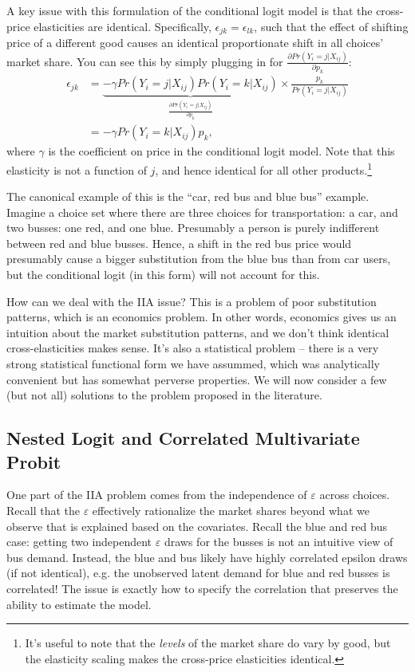 \documentclass{tufte-handout}
\theoremstyle{break}
\begin{document}
A key issue with this formulation of the conditional logit model is that the cross-price elasticities are identical. Specifically, $\epsilon_{jk} = \epsilon_{lk}$, such that the effect of shifting price of a different good causes an identical proportionate shift in all choices' market share. You can see this by simply plugging in for $ \frac{\partial Pr(Y_{i} = j | X_{ij})}{\partial p_{k}}$:  \begin{align*}
            \epsilon_{jk} &= \underbrace{-\gamma Pr(Y_{i} = j|X_{ij} )Pr(Y_{i} = k | X_{ij} )}_{\frac{\partial Pr(Y_{i} = j | X_{ij} )}{\partial p_{k}}} \times \frac{p_{k}}{Pr(Y_{i} = j | X_{ij})}\\
                          &= -\gamma Pr(Y_{i} = k | X_{ij} )p_{k},
          \end{align*}
where $\gamma$ is the coefficient on price in the conditional logit model. Note that this elasticity is not a function of $j$, and hence identical for all other products.\footnote{It's useful to note that the \emph{levels} of the market share do vary by good, but the elasticity scaling makes the cross-price elasticities identical.} 

The canonical example of this is the ``car, red bus and blue bus'' example. Imagine a choice set where there are three choices for transportation: a car, and two busses: one red, and one blue.  Presumably a person is purely indifferent between red and blue busses. Hence, a shift in the red bus price would presumably cause a bigger substitution from the blue bus than from car users, but the conditional logit (in this form) will not account for this.

How can we deal with the IIA issue? This is a problem of poor substitution patterns, which is an economics problem. In other words, economics  gives us an intuition about the market substitution patterns, and we don't think identical cross-elasticities makes sense. It's also a statistical problem -- there is a very strong statistical functional form we have assummed, which was analytically convenient but has somewhat perverse properties. We will now consider a few (but not all) solutions to the problem proposed in the literature.

\subsection{Nested Logit and Correlated Multivariate Probit}

One part of the IIA problem comes from the independence of $\varepsilon$ across choices. Recall that the $\varepsilon$ effectively rationalize the market shares beyond what we observe that is explained based on the covariates. Recall the blue and red bus case: getting two independent $\varepsilon$ draws for the busses is not an intuitive view of bus demand. Instead, the blue and bus likely have highly correlated epsilon draws (if not identical), e.g. the unobserved latent demand for blue and red busses is correlated!  The issue is exactly how to specify the correlation  that preserves the ability to estimate the model.
\end{document}
